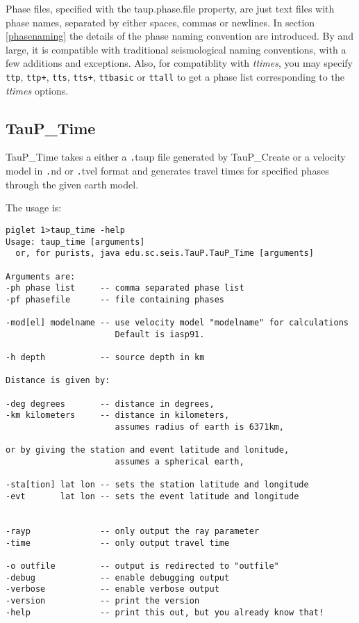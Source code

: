 Phase files, specified with the taup.phase.file property,
 are just text files with phase names, separated by either 
spaces, commas or newlines. In section \ref{phasenaming} the details of 
the phase naming convention are introduced. 
By and large, it is compatible with traditional 
seismological naming conventions, with a few additions and exceptions.
Also, for compatiblity with \textit{ttimes}, you may specify 
\texttt{ttp}, \texttt{ttp+}, \texttt{tts}, \texttt{tts+},
\texttt{ttbasic} or \texttt{ttall} to get a phase list corresponding 
to the \textit{ttimes} options.

\subsection{TauP\_Time}
TauP\_Time takes a either a {\texttt .taup} file generated by TauP\_Create or a velocity model in
{\texttt .nd} or {\texttt .tvel} format and generates 
travel times for specified phases through the given earth model. 

The usage is:
\begin{verbatim}
piglet 1>taup_time -help
Usage: taup_time [arguments]
  or, for purists, java edu.sc.seis.TauP.TauP_Time [arguments]

Arguments are:
-ph phase list     -- comma separated phase list
-pf phasefile      -- file containing phases

-mod[el] modelname -- use velocity model "modelname" for calculations
                      Default is iasp91.

-h depth           -- source depth in km

Distance is given by:

-deg degrees       -- distance in degrees,
-km kilometers     -- distance in kilometers,
                      assumes radius of earth is 6371km,

or by giving the station and event latitude and lonitude,
                      assumes a spherical earth,

-sta[tion] lat lon -- sets the station latitude and longitude
-evt       lat lon -- sets the event latitude and longitude


-rayp              -- only output the ray parameter
-time              -- only output travel time

-o outfile         -- output is redirected to "outfile"
-debug             -- enable debugging output
-verbose           -- enable verbose output
-version           -- print the version
-help              -- print this out, but you already know that!
\end{verbatim} 

